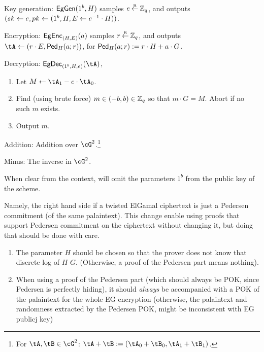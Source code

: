 \begin{algorithm}\label{alg:TEGinExp}~
	
	
	\item[Key generation:] $\mathsf{EgGen}(1^b,H)$ samples $e\mathbin{\stackrel{\mbox{\tiny R}}{\leftarrow}} {\mathbb Z}_q$, and outputs $({sk} 
	\leftarrow e,{pk} \leftarrow (1^b,H,E\leftarrow  e^{-1}\cdot H))$.
	
	\item[Encryption:] $\mathsf{EgEnc}_{(H,E)}(a)$  samples $r\mathbin{\stackrel{\mbox{\tiny R}}{\leftarrow}} {\mathbb Z}_q$, and outputs  $\tA \asn (r\cdot E, \Ped_H(a;r))$, for 
	$\mathsf{Ped}_H(a;r) := r\cdot H + a \cdot G$.
	
	
	\item[Decryption:] $\EgDec_{(1^b,H,e)}(\tA)$,   
	\begin{enumerate}
		\item 	Let $M \asn \tA_1 - e\cdot \tA_0$.
		
		\item Find (using brute force) $m\in (-b, b) \in {\mathbb Z}_q$ so that $m\cdot G = M$. Abort if no such $m$ exists.
		
		\item Output $m$.
	\end{enumerate}
	
	\item[Addition:] Addition over  $\cG^2$.\footnote{For $\tA,\tB \in \cG^2$: $\tA +\tB \eqdef (\tA_0+\tB_0,\tA_1+\tB_1)$.}
	
	\item[Minus:]  The inverse in $\cG^2$.
	
\end{algorithm}	
When clear from the context,  will omit the parameters $1^b$ from the public key of the scheme.

Namely, the right hand side if a twisted ElGamal ciphertext is just a  Pedersen  commitment \cite{Pedersen91} (of the same palaintext). This change enable  using proofs that  support  Pedersen commitment on the ciphertext without changing it, but doing that  should be done with care.
\begin{enumerate}
	\item The parameter $H$ should be chosen so that the prover does not know that discrete log of $H$ \wrt $G$. (Otherwise, a proof of the Pedersen part means nothing).
	
	\item When using a proof of  the Pedersen part (which should always be POK, since Pedersen is perfectly hiding), it should \emph{always} be accompanied with a POK of the palaintext for the whole EG encryption (otherwise, the palaintext and randomness  extracted by the  Pedersen POK, might be  inconsistent with  EG publicj key)  
\end{enumerate}

